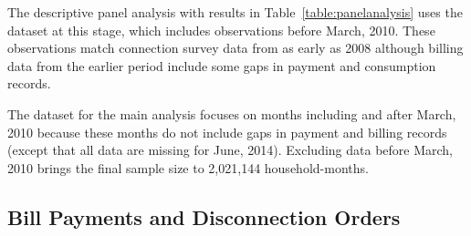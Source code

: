 \documentclass[12pt]{article}
\begin{document}
The descriptive panel analysis with results in Table~\ref{table:panelanalysis} uses the dataset at this stage, which includes observations before March, 2010.  These observations match connection survey data from as early as 2008 although billing data from the earlier period include some gaps in payment and consumption records.

The dataset for the main analysis focuses on months including and after March, 2010 because these months do not include gaps in payment and billing records (except that all data are missing for June, 2014).  Excluding data before March, 2010 brings the final sample size to 2,021,144 household-months.

\begin{table}[H]
\centering
\caption{Sample Construction}\label{table:sampleconstruction}
\vspace{-2mm}
\end{table}

\subsection{Bill Payments and Disconnection Orders}\label{appendix:paywarning}
\end{document}
